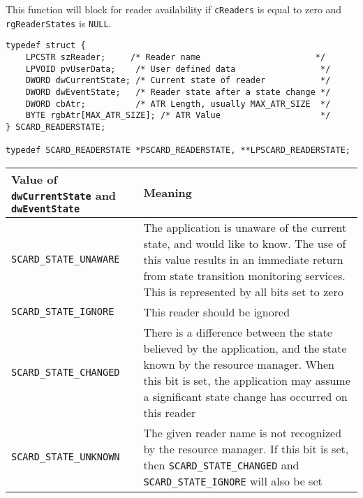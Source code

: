 \documentclass[a4paper,12pt]{article}
\begin{document}
This function will block for reader availability if \texttt{cReaders} is
equal to zero and \texttt{rgReaderStates} is \texttt{NULL}.

\begin{verbatim}
typedef struct {
    LPCSTR szReader;     /* Reader name                       */
    LPVOID pvUserData;    /* User defined data                 */
    DWORD dwCurrentState; /* Current state of reader           */
    DWORD dwEventState;   /* Reader state after a state change */
    DWORD cbAtr;          /* ATR Length, usually MAX_ATR_SIZE  */
    BYTE rgbAtr[MAX_ATR_SIZE]; /* ATR Value                    */
} SCARD_READERSTATE;

typedef SCARD_READERSTATE *PSCARD_READERSTATE, **LPSCARD_READERSTATE;
\end{verbatim}

\begin{tabular}{|p{5cm}|p{10.5cm}|}
\hline
Value of \texttt{dwCurrentState} and \texttt{dwEventState} & Meaning \\
\hline
\hline
\texttt{SCARD\_STATE\_UNAWARE} & The application is unaware of the
current state, and would like to know. The use of this value results in
an immediate return from state transition monitoring services.  This is
represented by all bits set to zero\\

\texttt{SCARD\_STATE\_IGNORE} & This reader should be ignored\\
\texttt{SCARD\_STATE\_CHANGED} & There is a difference between the state
believed by the application, and the state known by the resource
manager. When this bit is set, the application may assume a significant
state change has occurred on this reader\\

\texttt{SCARD\_STATE\_UNKNOWN} & The given reader name is not recognized
by the resource manager. If this bit is set, then
\texttt{SCARD\_STATE\_CHANGED} and \texttt{SCARD\_STATE\_IGNORE} will
also be set\\

\hline
\end{tabular}
\end{document}
